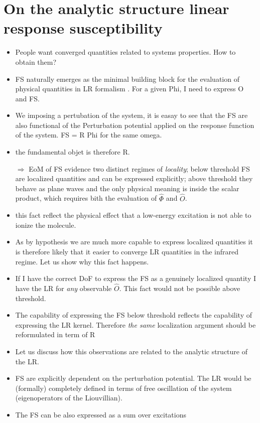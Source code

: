 \documentclass[a4paper]{article}
\newcommand{\op}[1]{\hat {#1}}
\begin{document}
\section{On the analytic structure linear response susceptibility}
\begin{itemize}
\item People want converged quantities related to systems properties. How to obtain them?
\item FS naturally emerges as the minimal building block for the evaluation of physical quantities in LR formalism . For a given Phi, I need to express O and FS.
\item We imposing a pertubation of the system, it is easay to see that the FS are also  functional of the Perturbation potential applied on the response function of the system. FS = R Phi for the same omega.
\item the fundamental objet is therefore R.
\item[$\Rightarrow$] EoM of FS evidence two distinct regimes of \emph{locality}; 
below threshold FS are localized quantities and can be expressed explicitly;
above threshold they behave as plane waves and the only physical meaning is inside the scalar product, which requires bith  the evaluation of $\op \Phi$ and $\op O$.
\item this fact reflect the physical effect that a low-energy excitation is not able to ionize the molecule.
\item As by hypothesis we are much more capable to express localized quantities it is therefore likely that it easier to converge LR quantities in the infrared regime. Let us show why this fact happens.
\item If I have the correct DoF to express the FS as a genuinely localized quantity I have the LR for \emph{any} observable $\op O$. This fact would not be possible above threshold.
\item The capability of expressing the FS below threshold reflects the capability of expressing the LR kernel. Therefore \emph{the same} localization argument should be reformulated in term of R
\item Let us discuss how this observations are related to the analytic structure of the LR.
\item FS are explicitly dependent on the perturbation potential. The LR would be (formally) completely defined in terms of free oscillation of the system (eigenoperators of the Liouvillian).
\item The FS can be also expressed as a sum over excitations

\end{itemize}
\end{document}
